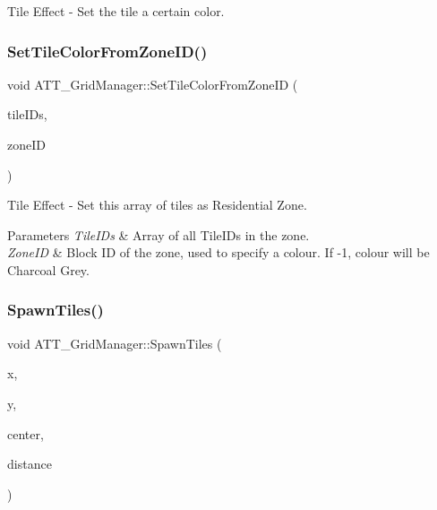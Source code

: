 Tile Effect -\/ Set the tile a certain color. 

\mbox{\label{class_a_t_t___grid_manager_acdaeb76af04a73d65ea6c249b3bace21}} 
\subsubsection{\texorpdfstring{SetTileColorFromZoneID()}{SetTileColorFromZoneID()}}
{\footnotesize\ttfamily void A\+T\+T\+\_\+\+Grid\+Manager\+::\+Set\+Tile\+Color\+From\+Zone\+ID (\begin{DoxyParamCaption}\item[{T\+Array$<$ int $>$}]{tile\+I\+Ds,  }\item[{int}]{zone\+ID }\end{DoxyParamCaption})}



Tile Effect -\/ Set this array of tiles as Residential Zone. 


\begin{DoxyParams}{Parameters}
{\em Tile\+I\+Ds} & Array of all Tile\+I\+Ds in the zone. \\
\hline
{\em Zone\+ID} & Block ID of the zone, used to specify a colour. If -\/1, colour will be Charcoal Grey. \\
\hline
\end{DoxyParams}
\mbox{\label{class_a_t_t___grid_manager_a76f1004ca0eab1f77d1591fb85caeb33}} 
\subsubsection{\texorpdfstring{SpawnTiles()}{SpawnTiles()}}
{\footnotesize\ttfamily void A\+T\+T\+\_\+\+Grid\+Manager\+::\+Spawn\+Tiles (\begin{DoxyParamCaption}\item[{int}]{x,  }\item[{int}]{y,  }\item[{F\+Vector}]{center,  }\item[{float}]{distance }\end{DoxyParamCaption})\hspace{0.3cm}{\ttfamily [protected]}}



